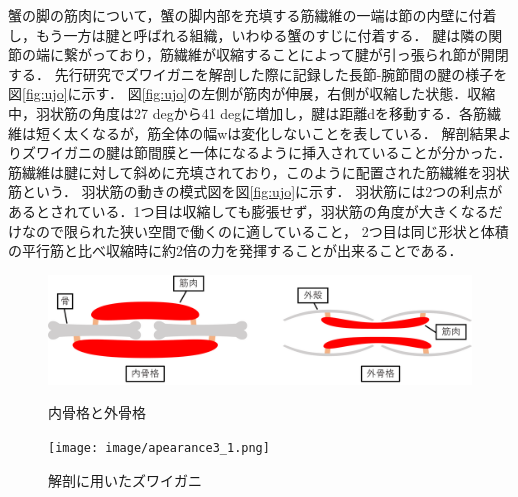 蟹の脚の筋肉について，蟹の脚内部を充填する筋繊維の一端は節の内壁に付着し，もう一方は腱と呼ばれる組織，いわゆる蟹のすじに付着する．
腱は隣の関節の端に繋がっており，筋繊維が収縮することによって腱が引っ張られ節が開閉する．
先行研究\cite{hasegawa}でズワイガニを解剖した際に記録した長節-腕節間の腱の様子を図\ref{fig:ujo}に示す．
図\ref{fig:ujo}の左側が筋肉が伸展，右側が収縮した状態．収縮中，羽状筋の角度は27 degから41 degに増加し，腱は距離dを移動する．各筋繊維は短く太くなるが，筋全体の幅wは変化しないことを表している．
解剖結果よりズワイガニの腱は節間膜と一体になるように挿入されていることが分かった\cite{hasegawa}．
筋繊維は腱に対して斜めに充填されており，このように配置された筋繊維を羽状筋という．
羽状筋の動きの模式図を図\ref{fig:ujo}に示す．
羽状筋には2つの利点があるとされている．1つ目は収縮しても膨張せず，羽状筋の角度が大きくなるだけなので限られた狭い空間で働くのに適していること，
2つ目は同じ形状と体積の平行筋と比べ収縮時に約2倍の力を発揮することが出来ることである\cite{warner1977biology}．
\begin{figure}[b]
  \begin{minipage}{0.49\hsize}
    \vspace{10mm}
    \centering
    \includegraphics[scale=0.058]{image/kokkaku.png}
    \vspace{5mm}
    \caption{内骨格と外骨格}
    \label{fig:naigai}
  \end{minipage}
  \begin{minipage}{0.49\hsize}
    \centering
    \texttt{[image: image/apearance3\_1.png]}
    \caption{解剖に用いたズワイガニ\cite{hasegawa}}
    \label{fig:zuwai}
  \end{minipage}
\end{figure}
